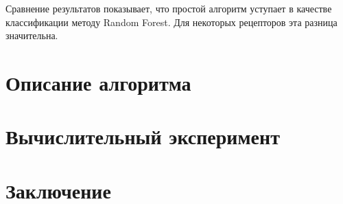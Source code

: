 \documentclass[12pt,twoside]{article}
\begin{document}
Сравнение результатов показывает, что простой алгоритм уступает в качестве классификации методу Random Forest. Для некоторых рецепторов эта разница значительна.

\section{Описание алгоритма}

\section{Вычислительный эксперимент}

\section{Заключение}


\clearpage

\end{document}
